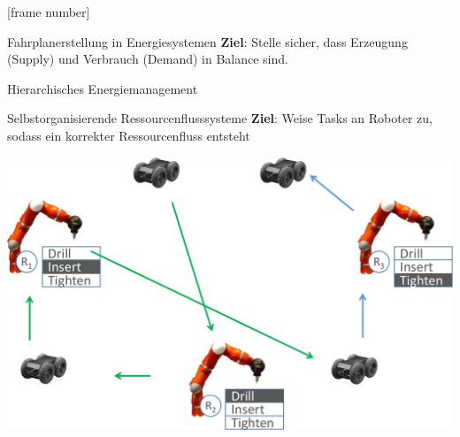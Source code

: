 

{

[frame number]{}



\begin{frame}{Fahrplanerstellung in Energiesystemen}
\textbf{Ziel}: Stelle sicher, dass \alert{Erzeugung} (Supply) und \alert{Verbrauch} (Demand) in Balance sind.

\end{frame}
}



\begin{frame}{Hierarchisches Energiemanagement} \large

\begin{figure}
\centering

\label{fig:hierarchical-decomposition}
\end{figure}
\end{frame}

\begin{frame}{Selbstorganisierende Ressourcenflusssysteme}
\textbf{Ziel}: Weise Tasks an Roboter zu, sodass ein korrekter \alert{Ressourcenfluss} entsteht
\begin{center}
\includegraphics[width=.7\textwidth]{img/produktionszelle.pdf}
\end{center}

\hfill \cite{seebach2010software}

\end{frame}



